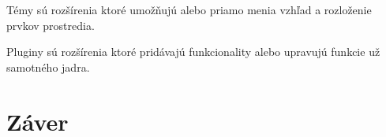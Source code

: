 \documentclass[10pt,twoside,slovak,a4paper]{article}
\begin{document}
Témy sú rozšírenia ktoré umožňujú alebo priamo menia vzhľad a rozloženie prvkov prostredia. 

Pluginy sú rozšírenia ktoré pridávajú funkcionality alebo upravujú funkcie už samotného jadra. 



\section{Záver} \label{zaver}









\end{document}
